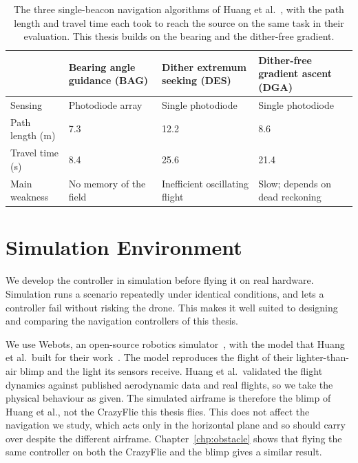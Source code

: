 \begin{table}[ht]
    \centering
    \caption{The three single-beacon navigation algorithms of Huang et al.~\cite{huang2026lta}, with the path length and travel time each took to reach the source on the same task in their evaluation. This thesis builds on the bearing and the dither-free gradient.}
    \label{tab:algorithms-comparison}
    \setlength{\tabcolsep}{4pt}
    \begin{tabular}{p{2.4cm} p{2.7cm} p{2.7cm} p{2.7cm}}
        \hline
         & Bearing angle guidance (BAG) & Dither extremum seeking (DES) & Dither-free gradient ascent (DGA) \\
        \hline
        Sensing          & Photodiode array       & Single photodiode             & Single photodiode \\
        Path length (m)  & 7.3                    & 12.2                          & 8.6 \\
        Travel time (s)  & 8.4                    & 25.6                          & 21.4 \\
        Main weakness    & No memory of the field & Inefficient oscillating flight & Slow; depends on dead reckoning \\
        \hline
    \end{tabular}
\end{table}

\section{Simulation Environment}
\label{sec:simulation}

We develop the controller in simulation before flying it on real hardware. Simulation runs a scenario repeatedly under identical conditions, and lets a controller fail without risking the drone. This makes it well suited to designing and comparing the navigation controllers of this thesis.

We use Webots, an open-source robotics simulator~\cite{webots}, with the model that Huang et al.\ built for their work~\cite{huang2026lta}. The model reproduces the flight of their lighter-than-air blimp and the light its sensors receive. Huang et al.\ validated the flight dynamics against published aerodynamic data and real flights, so we take the physical behaviour as given. The simulated airframe is therefore the blimp of Huang et al., not the CrazyFlie this thesis flies. This does not affect the navigation we study, which acts only in the horizontal plane and so should carry over despite the different airframe. Chapter~\ref{chp:obstacle} shows that flying the same controller on both the CrazyFlie and the blimp gives a similar result.

